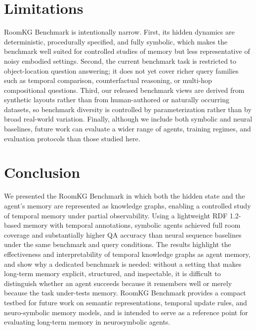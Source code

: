 \documentclass[Afour,sageh,times]{sagej}
\begin{document}
\section{Limitations}

RoomKG Benchmark is intentionally narrow. First, its hidden dynamics are deterministic,
procedurally specified, and fully symbolic, which makes the benchmark well suited for
controlled studies of memory but less representative of noisy embodied settings.
Second, the current benchmark task is restricted to object-location question answering;
it does not yet cover richer query families such as temporal comparison, counterfactual
reasoning, or multi-hop compositional questions. Third, our released benchmark views are
derived from synthetic layouts rather than from human-authored or naturally occurring
datasets, so benchmark diversity is controlled by parameterization rather than by broad
real-world variation. Finally, although we include both symbolic and neural baselines,
future work can evaluate a wider range of agents, training regimes, and evaluation
protocols than those studied here.

\section{Conclusion}

We presented the RoomKG Benchmark in which both the hidden state and the agent’s
memory are represented as knowledge graphs, enabling a controlled study of temporal
memory under partial observability. Using a lightweight RDF 1.2-based memory with
temporal annotations, symbolic agents achieved full room coverage and
substantially higher QA accuracy than neural sequence baselines under the same
benchmark and query conditions. The results highlight the effectiveness and
interpretability of temporal knowledge graphs as agent memory, and show why a dedicated
benchmark is needed: without a setting that makes long-term memory explicit, structured,
and inspectable, it is difficult to distinguish whether an agent succeeds because it
remembers well or merely because the task under-tests memory. RoomKG Benchmark provides
a compact testbed for future work on semantic representations, temporal update rules,
and neuro-symbolic memory models, and is intended to serve as a reference point for
evaluating long-term memory in neurosymbolic agents.




\end{document}
